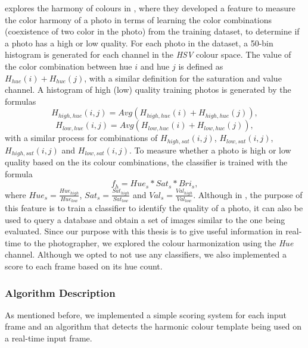 \citeauthor{luo2008photo} explores the harmony of colours in \cite{luo2008photo}, where they developed a feature to measure the color harmony of a photo in terms of learning the color combinations (coexistence of two color in the photo) from the training dataset, to determine if a photo has a high or low quality.
For each photo in the dataset, a 50-bin histogram is generated for each channel in the \emph{HSV} colour space. The value of the color combination between hue $i$ and hue $j$ is defined as $H_{hue}(i) + H_{hue}(j)$, with a similar definition for the saturation and value channel. A histogram of high (low) quality training photos is generated by the formulas
\begin{equation}
H_{high,hue}(i,j) = Avg(H_{high,hue}(i)+H_{high,hue}(j)),
\end{equation}
\begin{equation}
H_{low,hue}(i,j) = Avg(H_{low,hue}(i)+H_{low,hue}(j)),
\end{equation}
with a similar process for combinations of $H_{high,sat}(i,j)$, $H_{low,sat}(i,j)$, $H_{high,sat}(i,j)$ and $H_{low,sat}(i,j)$.
To measure whether a photo is high or low quality based on the its colour combinations, the classifier is trained with the formula
\begin{equation}
f_{h} = Hue_{s}*Sat_{s}*Bri_{s},
\end{equation}
where $Hue_{s} = \frac{Hue_{high}}{Hue_{low}}$, $Sat_{s} = \frac{Sat_{high}}{Sat_{low}}$ and $Val_{s} = \frac{Val_{high}}{Val_{low}}$.
Although in \cite{luo2008photo}, the purpose of this feature is to train a classifier to identify the quality of a photo, it can also be used to query a database and obtain a set of images similar to the one being evaluated. Since our purpose with this thesis is to give useful information in real-time to the photographer, we explored the colour harmonization using the \emph{Hue} channel. Although we opted to not use any classifiers, we also implemented a score to each frame based on its hue count.

\subsubsection{Algorithm Description}
As mentioned before, we implemented a simple scoring system for each input frame and an algorithm that detects the harmonic colour template being used on a real-time input frame.

